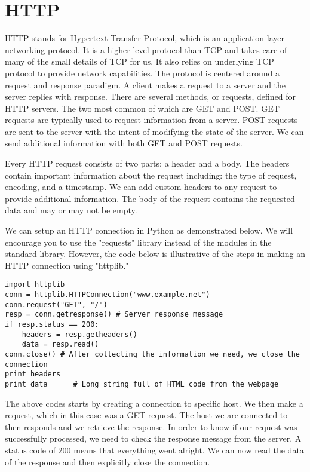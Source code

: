 \section*{HTTP}
HTTP stands for Hypertext Transfer Protocol, which is an application layer networking protocol.
It is a higher level protocol than TCP and takes care of many of the small details of TCP for us.
It also relies on underlying TCP protocol to provide network capabilities.
The protocol is centered around a request and response paradigm.
A client makes a request to a server and the server replies with response.
There are several methods, or requests, defined for HTTP servers. The two most common of which are GET and POST.
GET requests are typically used to request information from a server.
POST requests are sent to the server with the intent of modifying the state of the server.  We can send additional information with both GET and POST requests.

Every HTTP request consists of two parts: a header and a body.
The headers contain important information about the request including: the type of request, encoding, and a timestamp.
We can add custom headers to any request to provide additional information.
The body of the request contains the requested data and may or may not be empty.

We can setup an HTTP connection in Python as demonstrated below.
We will encourage you to use the "requests" library instead of the modules in the standard library.
However, the code below is illustrative of the steps in making an HTTP connection using "httplib."
\begin{lstlisting}
import httplib
conn = httplib.HTTPConnection("www.example.net")
conn.request("GET", "/")
resp = conn.getresponse() # Server response message
if resp.status == 200:
    headers = resp.getheaders()
    data = resp.read()
conn.close() # After collecting the information we need, we close the connection
print headers
print data      # Long string full of HTML code from the webpage
\end{lstlisting}
The above codes starts by creating a connection to specific host.
We then make a request, which in this case was a GET request.
The host we are connected to then responds and we retrieve the response.
In order to know if our request was successfully processed, we need to check the response message from the server.
A status code of $200$ means that everything went alright.
We can now read the data of the response and then explicitly close the connection.

